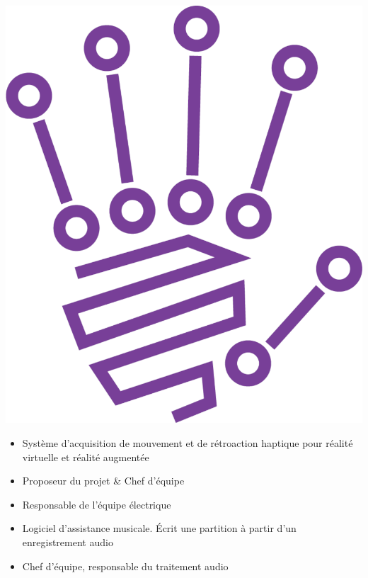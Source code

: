 \documentclass[10pt,a4paper,withhyper]{altacv}
\begin{document}
\hfill\begin{minipage}{1.15cm}
    \includegraphics[width=\linewidth]{figures/reali-plus}
\end{minipage}
\vspace{-1.35cm}

\begin{itemize}
\item Système d'acquisition de mouvement et de rétroaction haptique pour réalité virtuelle et réalité augmentée
\item Proposeur du projet \& Chef d'équipe
\item Responsable de l'équipe électrique
\end{itemize}

\divider

\begin{itemize}
\item Logiciel d'assistance musicale. Écrit une partition à partir d'un enregistrement audio
\item Chef d'équipe, responsable du traitement audio
\end{itemize}
\end{document}
